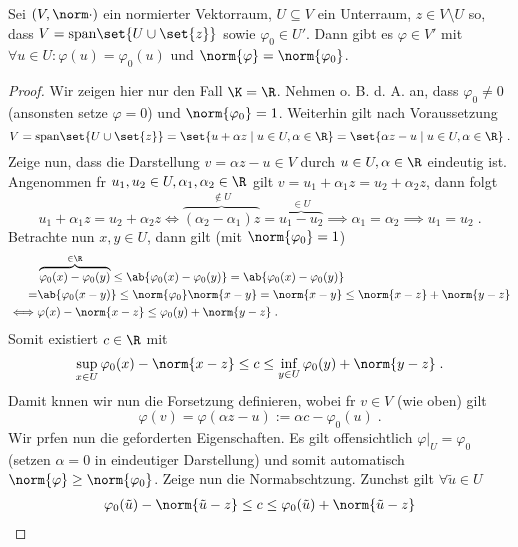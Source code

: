 	\begin{lemma}
		Sei \((V,\norm\cdot)\) ein normierter Vektorraum, \(U\subseteq V\) ein Unterraum, \(z \in V\setminus U\) so, dass \(V = \text{span}\set{U \cup \set{z}}\) sowie \(\varphi_0 \in U'\). Dann gibt es \(\varphi \in V'\) mit \(\forall u \in U: \varphi(u) = \varphi_0(u)\) und \(\norm{\varphi} = \norm{\varphi_0}\).
	
		\label{Lemma_Hahn_Banach}
	\end{lemma}
	\begin{proof}
		Wir zeigen hier nur den Fall \(\K = \R\). Nehmen o. B. d. A. an, dass \(\varphi_0 \neq 0\) (ansonsten setze \(\varphi = 0\)) und \(\norm{\varphi_0} = 1\). Weiterhin gilt nach Voraussetzung
		\[V = \text{span}\set{U\cup\set{z}} = \set{u + \alpha z \;\vert\; u \in U, \alpha \in \R} = \set{\alpha z - u \;\vert\; u \in U, \alpha\in \R}\;.\]
		Zeige nun, dass die Darstellung \(v = \alpha z - u \in V\) durch \(u\in U, \alpha \in \R\) eindeutig ist. Angenommen f\us r \(u_1, u_2 \in U, \alpha_1, \alpha_2 \in \R\) gilt \(v = u_1 + \alpha_1 z = u_2 + \alpha_2 z\), dann folgt
		\[u_1 + \alpha_1 z = u_2 + \alpha_2 z \iff \overbrace{(\alpha_2 - \alpha_1)z}^{\not\in U} = \overbrace{u_1 - u_2}^{\in U}\implies \alpha_1 = \alpha_2 \implies u_1 = u_2\;.\]
		Betrachte nun \(x,y \in U\), dann gilt (mit \(\norm{\varphi_0} = 1\))
		\begin{align*}&\overbrace{\varphi_0(x) -\varphi_0(y)}^{\in \R} \leq \ab{\varphi_0(x) -\varphi_0(y)} = \ab{\varphi_0(x) -\varphi_0(y)} \\= &\ab{\varphi_0(x-y)} \leq \norm{\varphi_0} \norm{x-y}  
			= \norm{x-y} \leq \norm{x-z} + \norm{y-z} \\ \iff &\varphi(x) - \norm{x-z} \leq \varphi_0(y) + \norm{y-z}\;.
			\end{align*}
			Somit existiert \(c\in \R\) mit 
			\[\sup_{x\in U}\varphi_0(x) - \norm{x-z}\leq c \leq \inf_{y\in U} \varphi_0(y) + \norm{y-z}\;.\]
			Damit k\os nnen wir nun die Forsetzung definieren, wobei f\us r \(v \in V\) (wie oben) gilt
			\[\varphi(v) = \varphi(\alpha z - u) := \alpha c - \varphi_0(u)\;.\]
			Wir pr\us fen nun die geforderten Eigenschaften. Es gilt offensichtlich \(\varphi\vert_U = \varphi_0\) (setzen \(\alpha = 0\) in eindeutiger Darstellung) und somit automatisch 
			\(\norm{\varphi} \geq \norm{\varphi_0}\). Zeige nun die Normabsch\as tzung. Zun\as chst gilt  \(\forall\tilde u \in U\)
			\begin{align*}
			& \varphi_0(\tilde u) - \norm{\tilde u - z} \leq c \leq \varphi_0 (\tilde u) + \norm{\tilde u -z} \\

\end{align*}
\end{proof}
